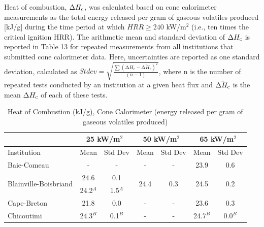 \documentclass{book}
\begin{document}
Heat of combustion, $\Delta H_{\rm c}$, was calculated based on cone calorimeter measurements as the total energy released per gram of gaseous volatiles produced [kJ/g] during the time period at which $HRR \ge 240$ kW/m$^2$ (i.e., ten times the critical ignition HRR). The arithmetic mean and standard deviation of $\Delta H_{\rm c}$ is reported in Table 13 for repeated measurements from all institutions that submitted cone calorimeter data. Here, uncertainties are reported as one standard deviation, calculated as $Stdev=\sqrt{\frac{\sum\left(\mathrm{\Delta}H_c-\bar{\mathrm{\Delta}H_c}\right)^2}{(n-1)}}$, where n is the number of repeated tests conducted by an institution at a given heat flux and $\bar{\Delta H_{\rm c}}$ is the mean $\Delta H_{\rm c}$ of each of these tests.

\begin{table}[ht]
\caption{Heat of Combustion (kJ/g), Cone Calorimeter (energy released per gram of gaseous volatiles produced)}
\label{Table_13}
\begin{center}
\begin{tabular}{|l|cc|cc|cc|}
\hline
                                        & \multicolumn{2}{|c|}{25 kW/m$^2$} &  \multicolumn{2}{|c|}{50 kW/m$^2$}             & \multicolumn{2}{|c|}{65 kW/m$^2$}                 \\ \hline
Institution                             & Mean     & Std Dev                & Mean                  & Std Dev                & Mean                  & Std Dev                   \\ \hline
Baie-Comeau                             & -        & -                      & -                     & -                      & 23.9                  & 0.6                       \\
\multirow{2}{*}{Blainville-Boisbriand}  & 24.6     & 0.1                    & \multirow{2}{*}{24.4} & \multirow{2}{*}{0.3}   & \multirow{2}{*}{24.5} & \multirow{2}{*}{0.2}      \\
                                        & 24.2$^A$ & 1.5$^A$                &                       &                        &                       &                           \\
Cape-Breton                             & 21.8     & 0.0                    & -                     & -                      & 23.6                  & 0.3                       \\
Chicoutimi                              & 24.3$^B$ & 0.1$^B$                & -                     & -                      & 24.7$^B$              & 0.0$^B$                   \\

\end{tabular}
\end{center}
\end{table}
\end{document}
